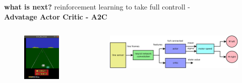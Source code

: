 \documentclass[xcolor=dvipsnames]{beamer}
\begin{document}
\begin{frame}{\bf what is next?}
reinforcement learning to take full controll - \\
{\bf Advatage Actor Critic - A2C}



\begin{columns}

  \begin{column}{0.3\textwidth}

      \begin{figure}
        \includegraphics[scale=0.2]{../images/enduro.png}
      \end{figure}

  \end{column}

  \begin{column}{0.7\textwidth}  %

      \begin{figure}
        \includegraphics[scale=0.14]{../diagrams/a2c_line_following.png}
      \end{figure}


\end{column}
\end{columns}
\end{frame}
\end{document}
